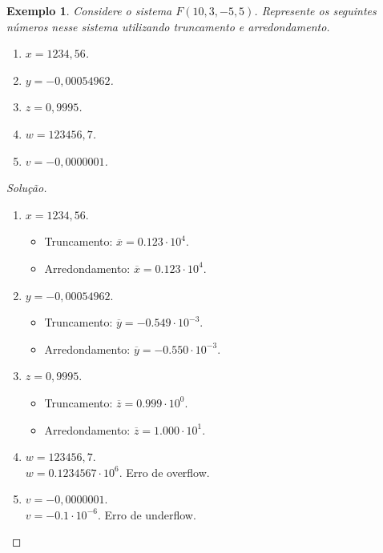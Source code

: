 \documentclass[
	12pt,				%
	openright,			%
	twoside,			%
	a4paper,			%
	english,			%
	french,				%
	brazil,				%
	sumario=tradicional
]{abntex2}
\newtheorem{example}{Exemplo}
\newenvironment{solution}{
	\begin{proof}[Solução]
}{\end{proof}}
\numberwithin{example}{chapter}
\numberwithin{remark}{chapter}
\numberwithin{definition}{chapter}
\numberwithin{figure}{chapter}
\begin{document}
\begin{example}
    Considere o sistema $F(10,3,-5,5)$. Represente os seguintes números nesse sistema utilizando truncamento e arredondamento.
    \begin{enumerate}
    	\item $x=1234,56$.
    	\item $y=-0,00054962$.
    	\item $z=0,9995$.
    	\item $w=123456,7$.
    	\item $v=-0,0000001$.
    \end{enumerate}
\end{example}
\begin{solution}\hfill
    \begin{enumerate}
        \item $x=1234,56$.
	        \begin{itemize}
			    \item Truncamento: $\overline{x}=0.123\cdot 10^{4}$.
			    \item Arredondamento: $\overline{x}=0.123\cdot 10^{4}$.
			\end{itemize}

        \item $y=-0,00054962$.
        	\begin{itemize}
			    \item Truncamento: $\overline{y}=-0.549\cdot 10^{-3}$.
			    \item Arredondamento: $\overline{y}=-0.550\cdot 10^{-3}$.
			\end{itemize}

        \item $z=0,9995$.
        	\begin{itemize}
			    \item Truncamento: $\overline{z}=0.999\cdot 10^{0}$.
			    \item Arredondamento: $\overline{z}=1.000\cdot 10^{1}$.
			\end{itemize}

        \item $w=123456,7$.\\
        	$w=0.1234567\cdot 10^6$. Erro de overflow.

        \item $v=-0,0000001$.\\
        	$v=-0.1\cdot 10^{-6}$. Erro de underflow.
    \end{enumerate}
\end{solution}
\end{document}
